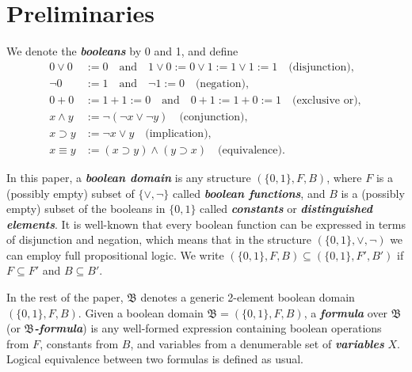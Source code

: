 \documentclass[11pt]{amsart}
\theoremstyle{definition} %
\begin{document}

\section{Preliminaries}\label{§:P}

We denote the \textit{\textbf{booleans}} by 0 and 1, and define
\begin{align*} 
	0\lor 0&:=0 \quad\text{and}\quad 1\lor 0:=0\lor 1:=1\lor 1:=1\quad\text{(disjunction)},\\
	\neg 0&:=1 \quad\text{and}\quad \neg 1:=0\quad\text{(negation)},\\
	0+0&:=1+1:=0 \quad\text{and}\quad 0+1:=1+0:=1 \quad\text{(exclusive or)},\\
	x\land y&:=\neg(\neg x\lor\neg y) \quad\text{(conjunction)},\\
	x\supset y&:=\neg x\lor y \quad\text{(implication)},\\
	x\equiv y&:=(x\supset y)\land (y\supset x) \quad\text{(equivalence)}.
\end{align*} %

In this paper, a \textit{\textbf{boolean domain}} is any structure $(\{0,1\},F,B)$, where $F$ is a (possibly empty) subset of $\{\lor,\neg\}$ called \textit{\textbf{boolean functions}}, and $B$ is a (possibly empty) subset of the booleans in $\{0,1\}$ called \textit{\textbf{constants}} or \textit{\textbf{distinguished elements}}. It is well-known that every boolean function can be expressed in terms of disjunction and negation, which means that in the structure $(\{0,1\},\lor,\neg)$ we can employ full propositional logic. We write $(\{0,1\},F,B)\subseteq (\{0,1\},F',B')$ if $F\subseteq F'$ and $B\subseteq B'$.

In the rest of the paper, $\mathfrak B$ denotes a generic 2-element boolean domain $(\{0,1\},F,B)$. Given a boolean domain $\mathfrak B=(\{0,1\},F,B)$, a \textit{\textbf{formula}} over $\mathfrak B$ (or \textit{\textbf{$\mathfrak B$-formula}}) is any well-formed expression containing boolean operations from $F$, constants from $B$, and variables from a denumerable set of \textit{\textbf{variables}} $X$. Logical equivalence between two formulas is defined as usual. 
\end{document}
